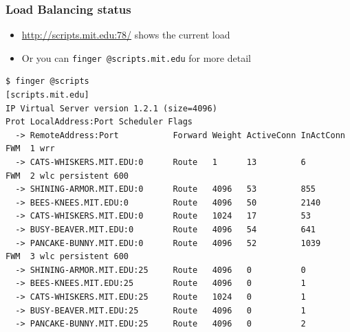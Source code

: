 \begin{frame}[fragile]
  \frametitle{Load Balancing status}
  \begin{itemize}
  \item \url{http://scripts.mit.edu:78/} shows the current load
  \item Or you can \texttt{finger @scripts.mit.edu} for more detail
  \end{itemize}
\begin{verbatim}
$ finger @scripts
[scripts.mit.edu]
IP Virtual Server version 1.2.1 (size=4096)
Prot LocalAddress:Port Scheduler Flags
  -> RemoteAddress:Port           Forward Weight ActiveConn InActConn
FWM  1 wrr
  -> CATS-WHISKERS.MIT.EDU:0      Route   1      13         6
FWM  2 wlc persistent 600
  -> SHINING-ARMOR.MIT.EDU:0      Route   4096   53         855
  -> BEES-KNEES.MIT.EDU:0         Route   4096   50         2140
  -> CATS-WHISKERS.MIT.EDU:0      Route   1024   17         53
  -> BUSY-BEAVER.MIT.EDU:0        Route   4096   54         641
  -> PANCAKE-BUNNY.MIT.EDU:0      Route   4096   52         1039
FWM  3 wlc persistent 600
  -> SHINING-ARMOR.MIT.EDU:25     Route   4096   0          0
  -> BEES-KNEES.MIT.EDU:25        Route   4096   0          1
  -> CATS-WHISKERS.MIT.EDU:25     Route   1024   0          1
  -> BUSY-BEAVER.MIT.EDU:25       Route   4096   0          1
  -> PANCAKE-BUNNY.MIT.EDU:25     Route   4096   0          2
\end{verbatim}
\end{frame}
